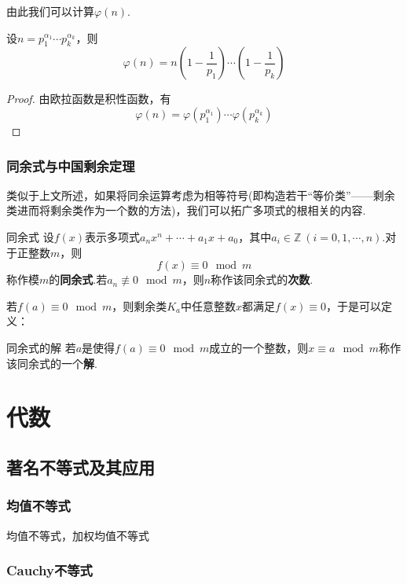 \documentclass[lang=cn, zihao=5]{elegantbook}
\newcommand{\ssb}[1]{\left( #1 \right)}
\begin{document}
由此我们可以计算$\varphi (n)$.

\begin{theorem}
	设$n=p_1^{\alpha _1} \cdots p_k^{\alpha _k}$，则$$\varphi (n) = n \ssb{1-\frac{1}{p_1}} \cdots \ssb{1-\frac{1}{p_k}}$$
\end{theorem}
\begin{proof}
	由欧拉函数是积性函数，有$$\varphi (n) = \varphi (p_1^{\alpha _1}) \cdots \varphi (p_k^{\alpha _k})$$
\end{proof}

\section{同余式与中国剩余定理}

类似于上文所述，如果将同余运算考虑为相等符号(即构造若干“等价类”——剩余类进而将剩余类作为一个数的方法)，我们可以拓广多项式的根相关的内容.

\begin{definition}{同余式}
	设$f(x)$表示多项式$a_nx^n + \cdots + a_1x + a_0$，其中$a_i \in \mathbb{Z}~(i=0,1,\cdots ,n)$.对于正整数$m$，则$$f(x) \equiv 0 \mod m$$
	称作模$m$的\textbf{同余式}.若$a_n \not\equiv 0 \mod m$，则$n$称作该同余式的\textbf{次数}.
\end{definition}

若$f(a) \equiv 0 \mod m$，则剩余类$K_a$中任意整数$x$都满足$f(x) \equiv 0$，于是可以定义：

\begin{definition}{同余式的解}
	若$a$是使得$f(a) \equiv 0 \mod m$成立的一个整数，则$x \equiv a \mod m$称作该同余式的一个\textbf{解}.
\end{definition}

\part{代数}

\chapter{著名不等式及其应用}

\section{均值不等式}

均值不等式，加权均值不等式

\section{Cauchy不等式}
\end{document}
